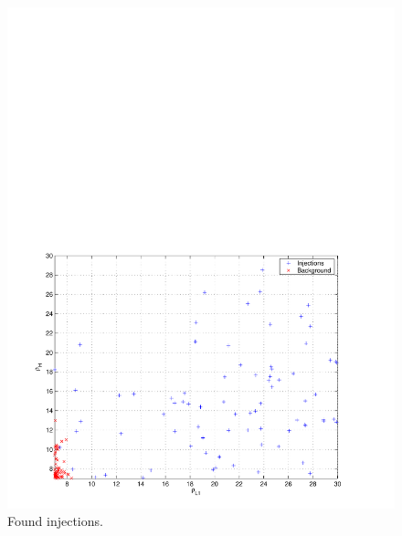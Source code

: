 \begin{figure}[p]
\begin{center}
\includegraphics[width=\textwidth]{figures/result/bkg_inj_zoom}
\end{center}
\caption{\label{f:bkg_hist}%
Found injections.
}
\end{figure}




